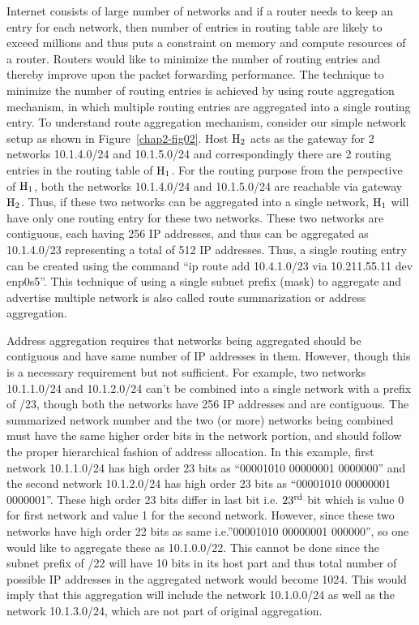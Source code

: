 \begin{multicols}{2}
Internet consists of large number of networks and if a router needs to keep an entry for each network, then number of entries in routing table are likely to exceed millions and thus puts a constraint on memory and compute resources of a router. Routers would like to minimize the number of routing entries and thereby improve upon the packet forwarding performance. The technique to minimize the number of routing entries is achieved by using route aggregation mechanism, in which multiple routing entries are aggregated into a single routing entry. To understand route aggregation mechanism, consider our simple network setup as shown in Figure~\ref{chap2-fig02}. Host ${\rm H}_{2}$ acts as the gateway for 2 networks 10.1.4.0/24 and 10.1.5.0/24 and correspondingly there are 2 routing entries in the routing table of ${\rm H}_{1}$. For the routing purpose from the perspective of ${\rm H}_{1}$, both the networks 10.1.4.0/24 and 10.1.5.0/24 are reachable via gateway ${\rm H}_{2}$. Thus, if these two networks can be aggregated into a single network, ${\rm H}_{1}$ will have only one routing entry for these two networks. These two networks are contiguous, each having 256 IP addresses, and thus can be aggregated as 10.1.4.0/23 representing a total of 512 IP addresses. Thus, a single routing entry can be created using the command “ip route add 10.4.1.0/23 via 10.211.55.11 dev enp0s5”. This technique of using a single subnet prefix (mask) to aggregate and advertise multiple network is also called route summarization or address aggregation.


Address aggregation requires that networks being aggregated should be contiguous and have same number of IP addresses in them. However, though this is a necessary requirement but not sufficient. For example, two networks 10.1.1.0/24 and 10.1.2.0/24 can’t be combined into a single network with a prefix of /23, though both the networks have 256 IP addresses and are contiguous. The summarized network number and the two (or more) networks being combined must have the same higher order bits in the network portion, and should follow the proper hierarchical fashion of address allocation. In this example, first network 10.1.1.0/24 has high order 23 bits as “00001010 00000001 0000000” and the second network 10.1.2.0/24 has high order 23 bits as “00001010 00000001 0000001”. These high order 23 bits differ in last bit i.e. $23^{\rm rd}$ bit which is value 0 for first network and value 1 for the second network. However, since these two networks have high order 22 bits as same i.e.”00001010 00000001 000000”, so one would like to aggregate these as 10.1.0.0/22. This cannot be done since the subnet prefix of /22 will have 10 bits in its host part and thus total number of possible IP addresses in the aggregated network would become 1024.  This would imply that this aggregation will include the network 10.1.0.0/24 as well as the network 10.1.3.0/24, which are not part of original aggregation.


\end{multicols}
